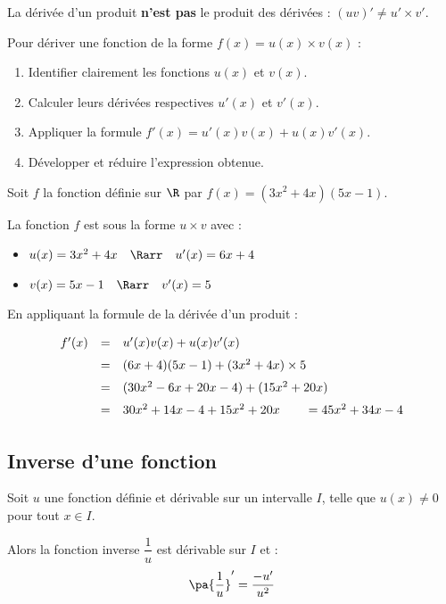 \begin{attention}
	La dérivée d'un produit \textbf{n'est pas} le produit des dérivées : $(uv)' \neq u' \times v'$.
\end{attention}

\begin{methode}
	Pour dériver une fonction de la forme $f(x) = u(x)\times v(x)$ :
	\begin{enumerate}
		\item Identifier clairement les fonctions $u(x)$ et $v(x)$.
		\item Calculer leurs dérivées respectives $u'(x)$ et $v'(x)$.
		\item Appliquer la formule $f'(x) = u'(x)v(x) + u(x)v'(x)$.
		\item Développer et réduire l'expression obtenue.
	\end{enumerate}
\end{methode}

\begin{ex}
	Soit $f$ la fonction définie sur $\R$ par $f(x) = (3x^2 + 4x)(5x - 1)$.

	La fonction $f$ est sous la forme $u \times v$ avec :
	\begin{itemize}
		\item $u(x) = 3x^2 + 4x \quad\Rarr\quad u'(x) = 6x + 4$
		\item $v(x) = 5x - 1 \quad\Rarr\quad v'(x) = 5$
	\end{itemize}

	En appliquant la formule de la dérivée d'un produit :
	\[
		\def\arraystretch{1.5}
		\begin{array}{rcl}
			f'(x) & = & u'(x)v(x) + u(x)v'(x)                                  \\
			      & = & (6x + 4)(5x - 1) + (3x^2 + 4x) \times 5                \\
			      & = & (30x^2 - 6x + 20x - 4) + (15x^2 + 20x)                 \\
			      & = & 30x^2 + 14x - 4 + 15x^2 + 20x \qquad = 45x^2 + 34x - 4
		\end{array}
	\]
\end{ex}

\subsection{Inverse d'une fonction}

\begin{prop}
	Soit $u$ une fonction définie et dérivable sur un intervalle $I$, telle que $u(x) \neq 0$ pour tout $x \in I$.

	Alors la fonction inverse $\dfrac{1}{u}$ est dérivable sur $I$ et :
	\[
		\pa{\dfrac{1}{u}}' = \dfrac{-u'}{u^2}
	\]
\end{prop}

